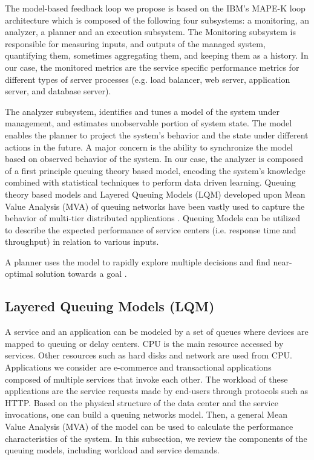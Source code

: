 \documentclass[11pt]{article}
\begin{document}
 The model-based feedback loop we propose is based on the IBM's MAPE-K loop architecture which is composed of the following four subsystems: a monitoring, an analyzer, a planner and an execution subsystem.
 The Monitoring subsystem is responsible for measuring inputs, and outputs of the managed system, quantifying them, sometimes aggregating them, and keeping them as a history.
In our case, the monitored metrics are the service specific performance metrics for different types of server processes (e.g. load balancer, web server, application server, and database server).

   The analyzer subsystem, identifies and tunes a model of the system under management, and estimates unobservable portion of system state. The model enables the planner to project the system's behavior and the state under different actions in the future. A major concern is the ability to synchronize the model based on observed behavior of the system. In our case, the analyzer is composed of a first principle queuing theory based model, encoding the system's knowledge combined with statistical techniques to perform data driven learning. 
   Queuing theory based models \cite{petriu_approximate_1994,petriu_approximate_2004,badidi-queuing-2005} and Layered Queuing Models (LQM) \cite{rolia_method_1995,ramesh_multi-layer_1998} developed upon Mean Value Analysis (MVA) of queuing networks have been vastly used to capture the behavior of multi-tier distributed applications \cite{litoiu_hierarchical_2005, xu_performance_2006,hamoun_ghanbari_tuning,liu_layered_????}. 
Queuing Models can be utilized to describe the expected performance of service centers (i.e. response time and throughput) in relation to various inputs. 
 
   A planner uses the model to rapidly explore multiple decisions and find near-optimal solution towards a goal \cite{litoiu_hierarchical_2005,aiber2004autonomic}. 
  
	\subsection{Layered Queuing Models (LQM)}  
	\label{sec:layered_queuing_model}
	 A service and an application can be modeled by a set of queues where devices are mapped to queuing or delay centers. CPU is the main resource accessed by services. Other resources such as hard disks and network are used from CPU. Applications we consider are e-commerce and transactional applications composed of multiple services that invoke each other. The workload of these applications are the service requests made by end-users through protocols such as HTTP. Based on the physical structure of the data center and the service invocations, one can build a queuing networks model. Then, a general Mean Value Analysis (MVA) of the model can be used to calculate the performance characteristics of the system. 
	In this subsection, we review the components of the queuing models, including workload and service demands. 
	
\end{document}
